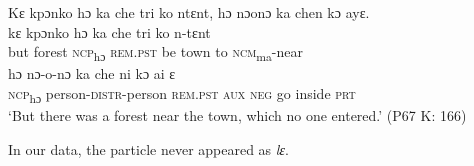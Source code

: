     \ex\label{ex:240b}  Kɛ kpɔnko hɔ ka che tri ko ntɛnt, hɔ nɔonɔ ka chen kɔ ayɛ.\\
    \gll kɛ    kpɔnko  hɔ    ka      che  tri    ko n-tɛnt\\
    but  forest    \textsc{ncp}\textsubscript{hɔ}  \textsc{rem.pst}  be    town  to \textsc{ncm}\textsubscript{ma}{}-near\\
    \gll hɔ      nɔ-o-nɔ          ka      che  ni    kɔ    ai      ɛ\\
    \textsc{ncp}\textsubscript{hɔ}    person-\textsc{distr}{}-person  \textsc{rem.pst}  \textsc{aux}  \textsc{neg}  go    inside    \textsc{prt}\\
    \glt ‘But there was a forest near the town, which no one entered.' (P67 K: 166)
\z
\z

In our data, the particle never appeared as \textit{lɛ}.

